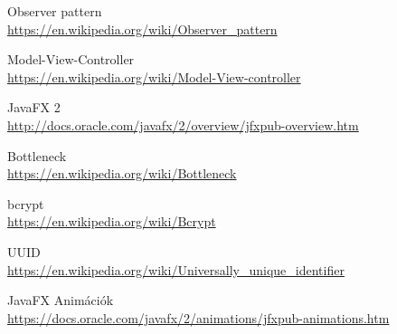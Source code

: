 \begin{thebibliography}{9}
Observer pattern \\
\url{https://en.wikipedia.org/wiki/Observer_pattern}

Model-View-Controller \\
\url{https://en.wikipedia.org/wiki/Model-View-controller}

JavaFX 2 \\
\url{http://docs.oracle.com/javafx/2/overview/jfxpub-overview.htm}

Bottleneck \\
\url{https://en.wikipedia.org/wiki/Bottleneck}

bcrypt \\
\url{https://en.wikipedia.org/wiki/Bcrypt}

UUID \\
\url{https://en.wikipedia.org/wiki/Universally_unique_identifier}

JavaFX Animációk \\
\url{https://docs.oracle.com/javafx/2/animations/jfxpub-animations.htm}

\end{thebibliography}